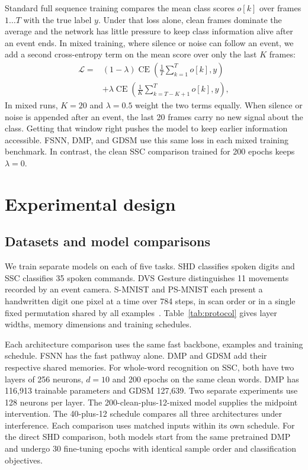 \documentclass[10pt,twocolumn]{article}
\newcommand{\CE}{\operatorname{CE}}
\begin{document}
Standard full sequence training compares the mean class scores $o[k]$ over frames $1\dots T$ with the true label $y$. Under that loss alone, clean frames dominate the average and the network has little pressure to keep class information alive after an event ends. In mixed training, where silence or noise can follow an event, we add a second cross-entropy term on the mean score over only the last $K$ frames:
\begin{equation}
\begin{aligned}
\mathcal L={}&(1-\lambda)\CE\!\left(\frac1T\sum_{k=1}^{T}o[k],y\right)\\
 &+\lambda\CE\!\left(\frac1K\sum_{k=T-K+1}^{T}o[k],y\right),
\end{aligned}
\label{eq:loss}
\end{equation}
In mixed runs, $K=20$ and $\lambda=0.5$ weight the two terms equally. When silence or noise is appended after an event, the last 20 frames carry no new signal about the class. Getting that window right pushes the model to keep earlier information accessible. FSNN, DMP, and GDSM use this same loss in each mixed training benchmark. In contrast, the clean SSC comparison trained for 200 epochs keeps $\lambda=0$.

\section{Experimental design}
\label{sec:setup}
\subsection{Datasets and model comparisons}
We train separate models on each of five tasks. SHD classifies spoken digits and SSC classifies 35 spoken commands. DVS Gesture distinguishes 11 movements recorded by an event camera. S-MNIST and PS-MNIST each present a handwritten digit one pixel at a time over 784 steps, in scan order or in a single fixed permutation shared by all examples~\cite{shd,gesture,mnist}. Table~\ref{tab:protocol} gives layer widths, memory dimensions and training schedules.

Each architecture comparison uses the same fast backbone, examples and training schedule. FSNN has the fast pathway alone. DMP and GDSM add their respective shared memories. For whole-word recognition on SSC, both have two layers of 256 neurons, $d=10$ and 200 epochs on the same clean words. DMP has 116,913 trainable parameters and GDSM 127,639. Two separate experiments use 128 neurons per layer. The 200-clean-plus-12-mixed model supplies the midpoint intervention. The 40-plus-12 schedule compares all three architectures under interference. Each comparison uses matched inputs within its own schedule. For the direct SHD comparison, both models start from the same pretrained DMP and undergo 30 fine-tuning epochs with identical sample order and classification objectives.
\end{document}
